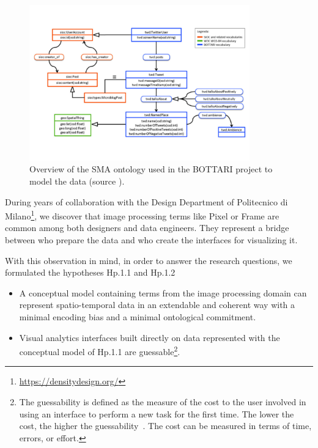\begin{figure}[t]
\centering
\includegraphics[width=0.85\textwidth]{img/sma-ontology}
\caption{Overview of the SMA ontology used in the BOTTARI project to model the data (source \cite{DBLP:journals/ws/BalduiniCDVHLKT12}).}
\label{fig:sma-onto}
\end{figure}

During years of collaboration with the Design Department of Politecnico di Milano\footnote{\url{https://densitydesign.org/}}, we discover that image processing terms like \textsf{Pixel} or \textsf{Frame} are common among both designers and data engineers. They represent a bridge between who prepare the data and who create the interfaces for visualizing it.

With this observation in mind, in order to answer the research questions, we formulated the hypotheses \textsf{Hp.1.1} and \textsf{Hp.1.2}

\begin{itemize}[leftmargin=42pt]
\item[\textsf{Hp.1.1}] A conceptual model containing terms from the image processing domain can represent spatio-temporal data in an extendable and coherent way with a minimal encoding bias and a minimal ontological commitment.
\item[\textsf{Hp.1.2}] Visual analytics interfaces built directly on data represented with the conceptual model of Hp.1.1 are guessable\footnote{The guessability is defined as the measure of the cost to the user involved in using an interface to perform a new task for the first time. The lower the cost, the higher the guessability~\cite{moyes1993icon}. The cost can be measured in terms of time, errors, or effort.}.
\end{itemize}


